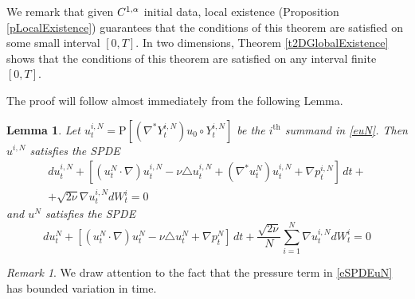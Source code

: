 \documentclass[final]{amsart}%
\newcommand{\lap}{\triangle}
\newcommand{\transpose}{^*}
\newcommand{\grad}{\nabla}
\newcommand{\gradt}{\grad\transpose}
\newcommand{\lhp}{\boldsymbol{\mathrm{P}}}
\newcommand{\holderspace}[2]{\ensuremath{C^{\ifx0#1{#2}\else{#1,#2}\fi}}}
\numberwithin{equation}{section}
\newtheorem{lemma}[theorem]{Lemma}
\theoremstyle{definition}
\theoremstyle{remark}
\newtheorem*{remark*}{Remark}
\begin{document}
We remark that given $\holderspace{1}{\alpha}$ initial data, local
existence (Proposition \ref{pLocalExistence}) guarantees that the
conditions of this theorem are satisfied on some small interval
$[0,T]$. In two dimensions, Theorem \ref{t2DGlobalExistence} shows
that the conditions of this theorem are satisfied on any interval
finite $[0,T]$.

The proof will follow almost immediately from the following Lemma.
\begin{lemma}\label{lSPDEui}%
Let $u^{i,N}_t = \lhp[ (\gradt Y^{i,N}_t) u_0\circ Y^{i,N}_t]$ be the $i^\text{th}$ summand in \eqref{euN}. Then $u^{i,N}$ satisfies the SPDE
\begin{multline}\label{eSPDEuiN}
  d u^{i,N}_t + \left[ (u^N_t \cdot \grad) u^{i,N}_t - \nu \lap
    u^{i,N}_t + (\gradt u^N_t) u^{i,N}_t +  \grad p^{i,N}_t\right] \,
  dt +\\ 
  + \sqrt{2\nu} \grad u^{i,N}_t dW^i_t = 0 
\end{multline}
and $u^N$ satisfies the SPDE
\begin{equation}\label{eSPDEuN}
  d u^N_t + \left[ (u^N_t \cdot \grad) u^N_t - \nu \lap u^N_t + \grad
    p^N_t \right] \, dt + \frac{\sqrt{2\nu}}{N} \sum_{i=1}^N \grad
  u^{i,N}_t dW^i_t = 0 
\end{equation}
\end{lemma}%
\begin{remark*}
  We draw attention to the fact that the pressure term in
  \eqref{eSPDEuN} has bounded variation in time.
\end{remark*}
\end{document}
